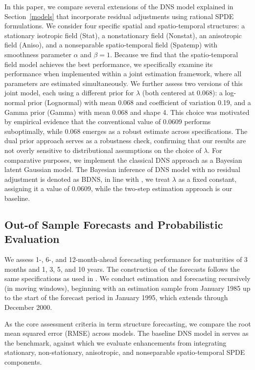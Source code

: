 \documentclass[
  12pt]{article}
\begin{document}
In this paper, we compare several extensions of the DNS model explained in Section~\ref{models} that incorporate residual adjustments using rational SPDE formulations. We consider four specific spatial and spatio-temporal structures: a stationary isotropic field (Stat), a nonstationary field (Nonstat), an anisotropic field (Aniso), and a nonseparable spatio-temporal field (Spatemp) with smoothness parameter $\alpha$ and $\beta = 1$. Because we find that the spatio-temporal field model achieves the best performance, we specifically examine its performance when implemented within a joint estimation framework, where all parameters are estimated simultaneously. We further assess two versions of this joint model, each using a different prior for $\lambda$ (both centered at 0.068): a log-normal prior (Lognormal) with mean 0.068 and coefficient of variation 0.19, and a Gamma prior (Gamma) with mean 0.068 and shape 4. This choice was motivated by empirical evidence that the conventional value of 0.0609 performs suboptimally, while 0.068 emerges as a robust estimate across specifications. The dual prior approach serves as a robustness check, confirming that our results are not overly sensitive to distributional assumptions on the choice of $\lambda$. For comparative purposes, we implement the classical DNS approach as a Bayesian latent Gaussian model. The Bayesian inference of DNS model with no residual adjustment is denoted as BDNS, in line with \cite{diebold2006forecasting}, we treat \(\lambda\) as a fixed constant, assigning it a value of 0.0609, while the two-step estimation approach is our baseline.

\subsection{Out-of Sample Forecasts and Probabilistic Evaluation}
We assess 1-, 6-, and 12-month-ahead forecasting performance for maturities of 3 months and 1, 3, 5, and 10 years. The construction of the forecasts follows the same specifications as used in \cite{diebold2006forecasting}. We conduct estimation and forecasting recursively (in moving windows), beginning with an estimation sample from January 1985 up to the start of the forecast period in January 1995, which extends through December 2000. 

As the core assessment criteria in term structure forecasting, we compare the root mean squared error (RMSE) across models. The baseline DNS model in \cite{diebold2006forecasting} serves as the benchmark, against which we evaluate enhancements from integrating stationary, non-stationary, anisotropic, and nonseparable spatio-temporal SPDE components. 
\end{document}
